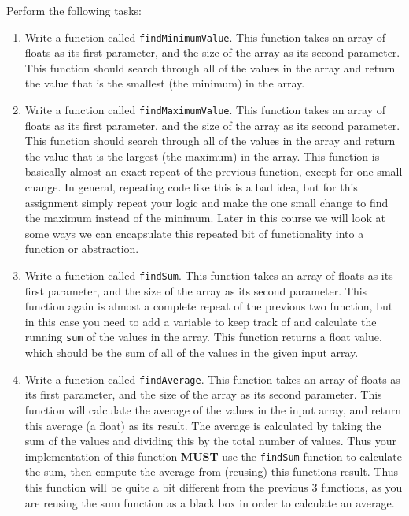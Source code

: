 \documentclass[11pt]{article}
\begin{document}
Perform the following tasks:

\begin{enumerate}
\item Write a function called \verb~findMinimumValue~.  This function takes
   an array of floats as its first parameter, and the size of the
   array as its second parameter.  This function should search through
   all of the values in the array and return the value that is the
   smallest (the minimum) in the array.
\item Write a function called \verb~findMaximumValue~.  This function takes an
   array of floats as its first parameter, and the size of the array
   as its second parameter.  This function should search through all
   of the values in the array and return the value that is the largest
   (the maximum) in the array.  This function is basically almost an
   exact repeat of the previous function, except for one small change.
   In general, repeating code like this is a bad idea, but for this
   assignment simply repeat your logic and make the one small change
   to find the maximum instead of the minimum.  Later in this course
   we will look at some ways we can encapsulate this repeated bit of
   functionality into a function or abstraction.
\item Write a function called \verb~findSum~.  This function takes an
   array of floats as its first parameter, and the size of the array
   as its second parameter.  This function again is almost a complete
   repeat of the previous two function, but in this case you need to
   add a variable to keep track of and calculate the running \verb~sum~ of
   the values in the array.  This function returns a float value,
   which should be the sum of all of the values in the given input
   array.
\item Write a function called \verb~findAverage~.  This function takes
   an array of floats as its first parameter, and the size of the array
   as its second parameter.  This function will calculate the average
   of the values in the input array, and return this average (a float)
   as its result.  The average is calculated by taking the sum of the
   values and dividing this by the total number of values.  Thus
   your implementation of this function \textbf{MUST} use the \verb~findSum~
   function to calculate the sum, then compute the average from
   (reusing) this functions result.  Thus this function will be quite a
   bit different from the previous 3 functions, as you are reusing the
   sum function as a black box in order to calculate an average.

\end{enumerate}
\end{document}
